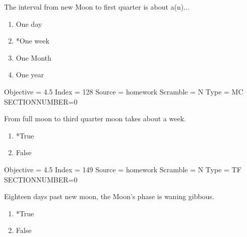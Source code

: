 \documentclass[11pt]{article}
\begin{document}
\begin{enumerate}
\begin{minipage}{\textwidth}
\begin{minipage}{\textwidth}
\item The interval from new Moon to first quarter is about a(n)...
\begin{multicols}{3}
\begin{enumerate} 
\setlength{\itemsep}{1pt} 
\setlength{\parskip}{0pt} 
\setlength{\parsep}{0pt}
\setlength{\multicolsep}{1pt} 
\item One day
\item *One week
\item One Month
\item One year
\end{enumerate} 
\vfill 
\end{multicols}

Objective = 4.5
Index = 128
Source = homework
Scramble = N
Type = MC
SECTIONNUMBER=0
\end{minipage}
\end{minipage}
\vskip 0.20in

\begin{minipage}{\textwidth}
\begin{minipage}{\textwidth}
\item From full moon to third quarter moon takes about a week.
\begin{multicols}{3}
\begin{enumerate} 
\setlength{\itemsep}{1pt} 
\setlength{\parskip}{0pt} 
\setlength{\parsep}{0pt}
\setlength{\multicolsep}{1pt} 
\item *True
\item False
\end{enumerate} 
\vfill 
\end{multicols}

Objective = 4.5
Index = 149
Source = homework
Scramble = N
Type = TF
SECTIONNUMBER=0
\end{minipage}
\end{minipage}
\vskip 0.20in

\begin{minipage}{\textwidth}
\begin{minipage}{\textwidth}
\item Eighteen days past new moon, the Moon's phase is waning gibbous.
\begin{multicols}{3}
\begin{enumerate} 
\setlength{\itemsep}{1pt} 
\setlength{\parskip}{0pt} 
\setlength{\parsep}{0pt}
\setlength{\multicolsep}{1pt} 
\item *True
\item False
\end{enumerate} 
\vfill 
\end{multicols}


\end{minipage}
\end{minipage}
\end{enumerate}
\end{document}
